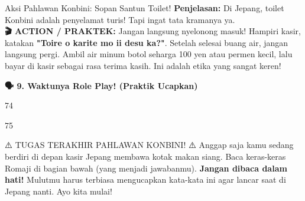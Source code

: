 \begin{lessonbox}{Aksi Pahlawan Konbini: Sopan Santun Toilet!}
    \textbf{Penjelasan:} Di Jepang, toilet Konbini adalah penyelamat turis! Tapi ingat tata kramanya ya.
    \\
    \textbf{🎬 ACTION / PRAKTEK:} 
    Jangan langsung nyelonong masuk! Hampiri kasir, katakan \textbf{"Toire o karite mo ii desu ka?"}. Setelah selesai buang air, jangan langsung pergi. Ambil air minum botol seharga 100 yen atau permen kecil, lalu bayar di kasir sebagai rasa terima kasih. Ini adalah etika yang sangat keren!
\end{lessonbox}

\vspace{2em}
\begin{tcolorbox}[colback=boxframe, colframe=boxframe, rounded corners, boxrule=0pt, arc=3mm, left=2mm, top=2mm, bottom=2mm]
    \Large \bfseries \color{white} 🗣️ 9. Waktunya Role Play! (Praktik Ucapkan)
\end{tcolorbox}
\vspace{1em}

\begin{convobox}{74}
    \noindent
      
     

    \vspace{1.5em}
\end{convobox}

\begin{convobox}{75}
    \noindent
      

    \vspace{1.5em}
\end{convobox}

\begin{lessonbox}{⚠️ TUGAS TERAKHIR PAHLAWAN KONBINI! ⚠️}
    Anggap saja kamu sedang berdiri di depan kasir Jepang membawa kotak makan siang. Baca keras-keras Romaji di bagian bawah (yang menjadi jawabanmu). \textbf{Jangan dibaca dalam hati!} Mulutmu harus terbiasa mengucapkan kata-kata ini agar lancar saat di Jepang nanti. Ayo kita mulai!
\end{lessonbox}

